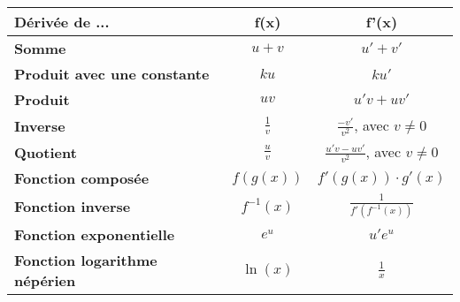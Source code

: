 \documentclass{report}
\begin{document}
      \begin{table}[h]
        \centering
        \renewcommand{\arraystretch}{1.7} %
        \begin{tabular}{|l|c|c|}
          \hline
          \textbf{Dérivée de ...} & \textbf{f(x)} & \textbf{f'(x)} \\
          \hline
          \textbf{Somme} & \( \displaystyle u + v \) & \( \displaystyle u' + v' \) \\
          \hline
          \textbf{Produit avec une constante} & \( \displaystyle ku \) & \( \displaystyle ku' \) \\
          \hline
          \textbf{Produit} & \( \displaystyle uv \) & \( \displaystyle u'v + uv' \) \\
          \hline
          \textbf{Inverse} & \( \displaystyle \frac{1}{v} \) & \( \displaystyle \frac{-v'}{v^2} \), avec \( v \neq 0 \) \\
          \hline
          \textbf{Quotient} & \( \displaystyle \frac{u}{v} \) & \( \displaystyle \frac{u'v - uv'}{v^2} \), avec \( v \neq 0 \) \\
          \hline
          \textbf{Fonction composée} & \( \displaystyle f(g(x)) \) & \( \displaystyle f'(g(x)) \cdot g'(x) \) \\
          \hline
          \textbf{Fonction inverse} & \( \displaystyle f^{-1}(x) \) & \( \displaystyle \frac{1}{f'(f^{-1}(x))} \) \\
          \hline
          \textbf{Fonction exponentielle} & \( \displaystyle e^u \) & \( \displaystyle u' e^u \) \\
          \hline
          \textbf{Fonction logarithme népérien} & \( \displaystyle \ln(x) \) & \( \displaystyle \frac{1}{x} \) \\
          \hline
        \end{tabular}
      \end{table}
    \fi
\end{document}
